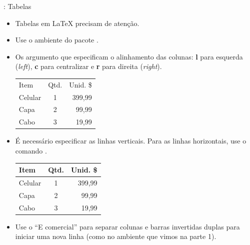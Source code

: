 \documentclass{beamer}
\begin{document}
\begin{frame}[fragile]{\insertsection: Tabelas}
\begin{itemize}
  \item Tabelas em \LaTeX{} precisam de atenção.
  \item Use o ambiente  do pacote .
  \item Os argumento que especificam o alinhamento das colunas: \textbf{l} para esquerda (\emph{left}), \textbf{c} para centralizar e \textbf{r} para direita (\emph{right}).
  \begin{exampletwouptiny}
\begin{tabular}{lcr}
Item    & Qtd. & Unid. \$ \\
Celular & 1    & 399,99  \\
Capa    & 2    & 99,99  \\
Cabo    & 3    & 19,99   \\
\end{tabular}
  \end{exampletwouptiny}
  \item É necessário especificar as linhas verticais. Para as linhas horizontais, use o comando .
  \begin{exampletwouptiny}
\begin{tabular}{|l|c|r|} \hline
Item    & Qtd. & Unid. \$ \\\hline
Celular & 1    & 399,99  \\
Capa    & 2    & 99,99  \\
Cabo    & 3    & 19,99   \\\hline
\end{tabular}
  \end{exampletwouptiny}
  \item Use o ``E comercial'' \keystrokebftt{\&} para separar colunas e barras invertidas duplas \keystrokebftt{\bs}\keystrokebftt{\bs} para iniciar uma nova linha (como no ambiente   que vimos na parte 1).
\end{itemize}
\end{frame}
\end{document}
